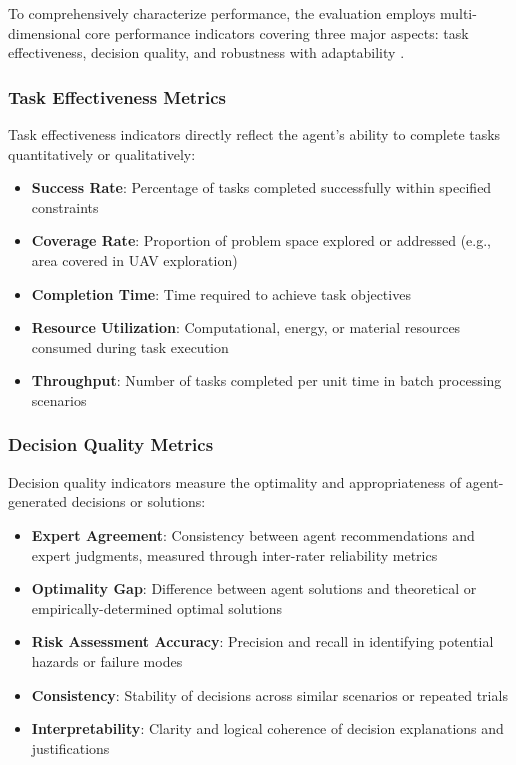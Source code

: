 To comprehensively characterize performance, the evaluation employs multi-dimensional core performance indicators covering three major aspects: task effectiveness, decision quality, and robustness with adaptability \cite{hernandez2022measuring}.

\subsubsection{Task Effectiveness Metrics}

Task effectiveness indicators directly reflect the agent's ability to complete tasks quantitatively or qualitatively:

\begin{itemize}
\item \textbf{Success Rate}: Percentage of tasks completed successfully within specified constraints
\item \textbf{Coverage Rate}: Proportion of problem space explored or addressed (e.g., area covered in UAV exploration)
\item \textbf{Completion Time}: Time required to achieve task objectives
\item \textbf{Resource Utilization}: Computational, energy, or material resources consumed during task execution
\item \textbf{Throughput}: Number of tasks completed per unit time in batch processing scenarios
\end{itemize}

\subsubsection{Decision Quality Metrics}

Decision quality indicators measure the optimality and appropriateness of agent-generated decisions or solutions:

\begin{itemize}
\item \textbf{Expert Agreement}: Consistency between agent recommendations and expert judgments, measured through inter-rater reliability metrics
\item \textbf{Optimality Gap}: Difference between agent solutions and theoretical or empirically-determined optimal solutions
\item \textbf{Risk Assessment Accuracy}: Precision and recall in identifying potential hazards or failure modes
\item \textbf{Consistency}: Stability of decisions across similar scenarios or repeated trials
\item \textbf{Interpretability}: Clarity and logical coherence of decision explanations and justifications
\end{itemize}

